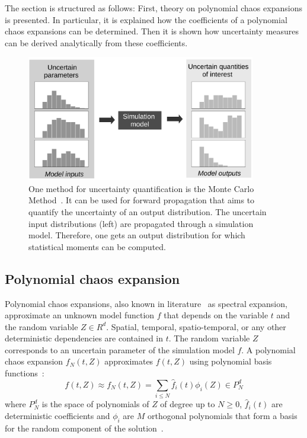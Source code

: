 The section is structured as follows: First, theory on polynomial chaos expansions is presented. In particular, it is explained how the coefficients of a polynomial chaos expansions can be determined. Then it is shown how uncertainty measures can be derived analytically from these coefficients.



\begin{figure}[hbt!]
\centering
\includegraphics[width=10cm]{../figures/state-of-the-art/uq/overview.pdf} 
\caption{One method for uncertainty quantification is the Monte Carlo Method~\cite{smith-2014-math}. It can be used for forward propagation that aims to quantify the uncertainty of an output distribution. The uncertain input distributions (left) are propagated through a simulation model. Therefore, one gets an output distribution for which statistical moments can be computed. }
\label{fig:uqforwardprop}
\end{figure}



\subsection{Polynomial chaos expansion}

Polynomial chaos expansions, also known in literature~\cite{smith-2014-math} as spectral expansion, approximate an unknown model function $f$ that depends on the variable $t$ and the random variable $Z \in R^d$. Spatial, temporal, spatio-temporal, or any other deterministic dependencies are contained in $t$. The random variable $Z$ corresponds to an uncertain parameter of the simulation model $f$. A polynomial chaos expansion $f_N(t,Z)$ approximates $f(t,Z)$ using polynomial basis functions~\cite[p.67]{xiu-2010-math}:
\begin{equation}
f(t,Z) \approx f_N(t,Z) = \sum_{i \leq N}  \hat{f}_i(t) \phi_{i}(Z) \in P_N^d
\label{eg:polynmialchaosex}
\end{equation}
where $P_N^d$ is the space of polynomials of $Z$ of degree up to $N \geq 0$, $\hat{f}_i(t)$ are deterministic coefficients and $\phi_i$ are $M$ orthogonal polynomials that form a basis for the random component of the solution~\cite[p.209]{smith-2014-math}.

